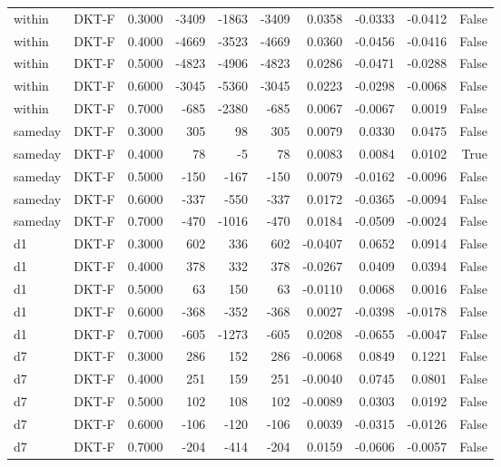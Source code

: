 \begin{tabular}{llrrrrrrrr}
within & DKT-F & 0.3000 & -3409 & -1863 & -3409 & 0.0358 & -0.0333 & -0.0412 & False \\
within & DKT-F & 0.4000 & -4669 & -3523 & -4669 & 0.0360 & -0.0456 & -0.0416 & False \\
within & DKT-F & 0.5000 & -4823 & -4906 & -4823 & 0.0286 & -0.0471 & -0.0288 & False \\
within & DKT-F & 0.6000 & -3045 & -5360 & -3045 & 0.0223 & -0.0298 & -0.0068 & False \\
within & DKT-F & 0.7000 & -685 & -2380 & -685 & 0.0067 & -0.0067 & 0.0019 & False \\
sameday & DKT-F & 0.3000 & 305 & 98 & 305 & 0.0079 & 0.0330 & 0.0475 & False \\
sameday & DKT-F & 0.4000 & 78 & -5 & 78 & 0.0083 & 0.0084 & 0.0102 & True \\
sameday & DKT-F & 0.5000 & -150 & -167 & -150 & 0.0079 & -0.0162 & -0.0096 & False \\
sameday & DKT-F & 0.6000 & -337 & -550 & -337 & 0.0172 & -0.0365 & -0.0094 & False \\
sameday & DKT-F & 0.7000 & -470 & -1016 & -470 & 0.0184 & -0.0509 & -0.0024 & False \\
d1 & DKT-F & 0.3000 & 602 & 336 & 602 & -0.0407 & 0.0652 & 0.0914 & False \\
d1 & DKT-F & 0.4000 & 378 & 332 & 378 & -0.0267 & 0.0409 & 0.0394 & False \\
d1 & DKT-F & 0.5000 & 63 & 150 & 63 & -0.0110 & 0.0068 & 0.0016 & False \\
d1 & DKT-F & 0.6000 & -368 & -352 & -368 & 0.0027 & -0.0398 & -0.0178 & False \\
d1 & DKT-F & 0.7000 & -605 & -1273 & -605 & 0.0208 & -0.0655 & -0.0047 & False \\
d7 & DKT-F & 0.3000 & 286 & 152 & 286 & -0.0068 & 0.0849 & 0.1221 & False \\
d7 & DKT-F & 0.4000 & 251 & 159 & 251 & -0.0040 & 0.0745 & 0.0801 & False \\
d7 & DKT-F & 0.5000 & 102 & 108 & 102 & -0.0089 & 0.0303 & 0.0192 & False \\
d7 & DKT-F & 0.6000 & -106 & -120 & -106 & 0.0039 & -0.0315 & -0.0126 & False \\
d7 & DKT-F & 0.7000 & -204 & -414 & -204 & 0.0159 & -0.0606 & -0.0057 & False \\
\bottomrule
\end{tabular}
